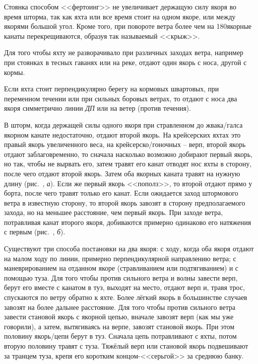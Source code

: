 Стоянка способом <<фертоинг>> не увеличивает держащую силу якоря во время шторма, так как яхта или все время стоит на одном якоре, или между якорями большой угол. Кроме того, при повороте ветра более чем на 180\gr якорные канаты перекрещиваются, образуя так называемый <<крыж>>.

Для того чтобы яхту не разворачивало при различных заходах ветра, например при стоянках в тесных гаванях или на реке, отдают один якорь с носа, другой с кормы.

Если яхта стоит перпендикулярно берегу на кормовых швартовых, при переменном течении или при сильных боровых ветрах, то отдают с носа два якоря симметрично линии \textit{ДП} или на ветер (против течения).

В шторм, когда держащей силы одного якоря при стравленном до жвака\-/галса якорном канате недостаточно, отдают второй якорь. На крейсерских яхтах это правый якорь увеличенного веса, на крейсерско\-/гоночных \--- верп, второй якорь отдают заблаговременно, то сначала насколько возможно добирают первый якорь, но так, чтобы не вырвать его, затем травят его канат отводят нос яхты в сторону, после чего отдают второй якорь. Затем оба якорных каната травят на нужную длину (рис.~, \textit{а}). Если же первый якорь <<пополз>>, то второй отдают прямо у борта, после чего травят только его канат. Если ожидается заход штормового ветра в известную сторону, то второй якорь завозят в сторону предполагаемого захода, но на меньшее расстояние, чем первый якорь. При заходе ветра, потравливая канат второго якоря, добиваются примерно одинаково его натяжения с первым (рис.~, \textit{б}).

Существуют три способа постановки на два якоря: с ходу, когда оба якоря отдают на малом ходу по линии, примерно перпендикулярной направлению ветра; с маневрированием на отданном якоре (стравливанием или подтягиванием) и с помощью туза. Для того чтобы против сильного ветра и волны завести верп, берут его вместе с канатом в туз, выходят на место, отдают верп и, травя трос, спускаются по ветру обратно к яхте. Более лёгкий якорь в большинстве случаев завозят на более дальнее расстояние. Для того чтобы против сильного ветра завести становой якорь с якорной цепью, вначале завозят верп (как мы уже говорили), а затем, вытягиваясь на верпе, завозят становой якорь. При этом половину якорь\-/цепи берут в туз. Сначала цепь потравливают с яхты, потом вторую половину травят с туза. Тяжёлый верп или становой якорь подвешивают за транцем туза, крепя его коротким концом-<<серьгой>> за среднюю банку.

